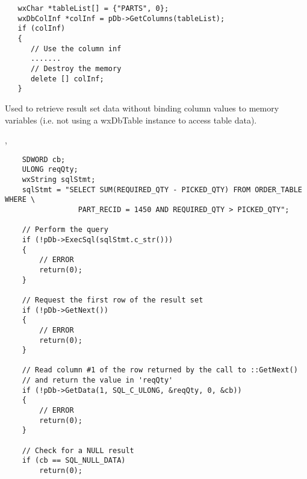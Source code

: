 

\begin{verbatim}
   wxChar *tableList[] = {"PARTS", 0};
   wxDbColInf *colInf = pDb->GetColumns(tableList);
   if (colInf)
   {
      // Use the column inf
      .......
      // Destroy the memory
      delete [] colInf;
   }
\end{verbatim}

\label{wxdbgetdata}


Used to retrieve result set data without binding column values to memory
variables (i.e. not using a wxDbTable instance to access table data).




, 


\begin{verbatim}
    SDWORD cb;
    ULONG reqQty;
    wxString sqlStmt;
    sqlStmt = "SELECT SUM(REQUIRED_QTY - PICKED_QTY) FROM ORDER_TABLE WHERE \
                 PART_RECID = 1450 AND REQUIRED_QTY > PICKED_QTY";

    // Perform the query
    if (!pDb->ExecSql(sqlStmt.c_str()))
    {
        // ERROR
        return(0);
    }

    // Request the first row of the result set
    if (!pDb->GetNext())
    {
        // ERROR
        return(0);
    }

    // Read column #1 of the row returned by the call to ::GetNext()
    // and return the value in 'reqQty'
    if (!pDb->GetData(1, SQL_C_ULONG, &reqQty, 0, &cb))
    {
        // ERROR
        return(0);
    }

    // Check for a NULL result
    if (cb == SQL_NULL_DATA)
        return(0);
\end{verbatim}

